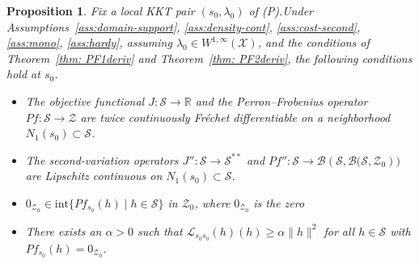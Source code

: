 \documentclass[12pt,leqno]{amsart}
\newtheorem{proposition}{Proposition}
\begin{document}
\begin{proposition}\label{prop:verify-alt-condition}Fix a local KKT pair $(s_0,\lambda_0)$ of (P).Under Assumptions~\ref{ass:domain-support}, \ref{ass:density-cont}, \ref{ass:cost-second}, \ref{ass:mono}, \ref{ass:hardy}, assuming $\lambda_0 \in W^{1,\infty}(\mathcal{X})$, and the conditions of Theorem~\ref{thm: PF1deriv} and Theorem~\ref{thm: PF2deriv}, the following conditions hold at $s_0$.
\begin{itemize}
\item[(B1)] The objective functional $J:\mathcal{S}\to\mathbb R$ and the Perron--Frobenius operator $Pf:\mathcal{S}\to\mathcal{Z}$ are twice continuously Fr\'echet differentiable on a neighborhood $N_1(s_0)\subset \mathcal{S}$.
\item[(B2)] The second-variation operators $J'':\mathcal{S}\to \mathcal{S}^{**}$ and $Pf'':\mathcal{S}\to \mathcal{B}(\mathcal{S},\mathcal{B}\big(\mathcal{S},\mathcal{Z}_0)\big)$ are Lipschitz continuous on $N_1(s_0)\subset \mathcal{S}$.
\item [(B3)] $0_{\mathcal{Z}_0} \in \mathrm{int}\Big\{Pf_{s_0}(h)\mid h\in\mathcal{S}\Big\}$ in $\mathcal{Z}_0$, where $0_{\mathcal{Z}_0}$ is the zero \item [(B4)] There exists an $\alpha>0$ such that $\mathcal{L}_{s_0 s_0}(h)(h)\geq\alpha\|h\|^2$
for all $h\in\mathcal{S}$ with $Pf_{s_0}(h)=0_{\mathcal{Z}_0}$.
\end{itemize}
\end{proposition}
\end{document}
